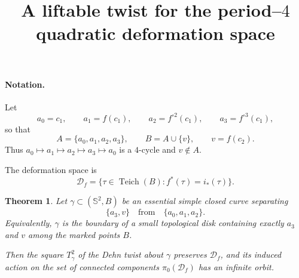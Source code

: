 \documentclass[11pt]{article}
\newtheorem{theorem}{Theorem}
\theoremstyle{remark}
\newcommand{\Dsp}{\mathcal D_f}
\newcommand{\Teich}{\operatorname{Teich}}
\begin{document}
\title{A liftable twist for the period--$4$ quadratic deformation space}
\author{}
\date{}
\maketitle

\paragraph{Notation.}
Let
\[
a_0=c_1,\qquad a_1=f(c_1),\qquad a_2=f^{\circ 2}(c_1),\qquad a_3=f^{\circ 3}(c_1),
\]
so that
\[
A=\{a_0,a_1,a_2,a_3\},\qquad B=A\cup\{v\},\qquad v=f(c_2).
\]
Thus \(a_0\mapsto a_1\mapsto a_2\mapsto a_3\mapsto a_0\) is a $4$-cycle and \(v\notin A\).

The deformation space is
\[
\Dsp=\{\tau\in \Teich(B): f^*(\tau)=i_*(\tau)\}.
\]

\begin{theorem}\label{thm:main}
Let \(\gamma\subset (\mathbb S^2,B)\) be an essential simple closed curve separating
\[
\{a_3,v\}\quad\text{from}\quad \{a_0,a_1,a_2\}.
\]
Equivalently, \(\gamma\) is the boundary of a small topological disk containing exactly
\(a_3\) and \(v\) among the marked points \(B\).

Then the square \(T_\gamma^2\) of the Dehn twist about \(\gamma\) preserves \(\Dsp\), and
its induced action on the set of connected components \(\pi_0(\Dsp)\) has an infinite orbit.
\end{theorem}
\end{document}
